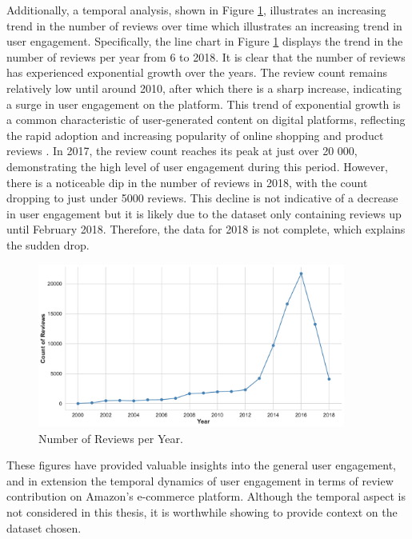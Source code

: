 Additionally, a temporal analysis, shown in Figure \ref{fig:reviews per year}, illustrates an increasing trend in the number of reviews over time which illustrates an increasing trend in user engagement. Specifically, the line chart in Figure \ref{fig:reviews per year} displays the trend in the number of reviews per year from 6 to 2018. It is clear that the number of reviews has experienced exponential growth over the years. The review count remains relatively low until around 2010, after which there is a sharp increase, indicating a surge in user engagement on the platform. This trend of exponential growth is a common characteristic of user-generated content on digital platforms, reflecting the rapid adoption and increasing popularity of online shopping and product reviews \cite{alzoubi2022effect}. In 2017, the review count reaches its peak at just over 20 000, demonstrating the high level of user engagement during this period. However, there is a noticeable dip in the number of reviews in 2018, with the count dropping to just under 5000 reviews. This decline is not indicative of a decrease in user engagement but it is likely due to the dataset only containing reviews up until February 2018. Therefore, the data for 2018 is not complete, which explains the sudden drop.

\begin{figure}[ht]
  \centering
  \includegraphics[width=0.9\textwidth]{Figures/reviews_per_year.pdf} %
  \caption{Number of Reviews per Year.}
  \label{fig:reviews per year}
\end{figure}

These figures have provided valuable insights into the general user engagement, and in extension the temporal dynamics of user engagement in terms of review contribution on Amazon's e-commerce platform. Although the temporal aspect is not considered in this thesis, it is worthwhile showing to provide context on the dataset chosen. 

